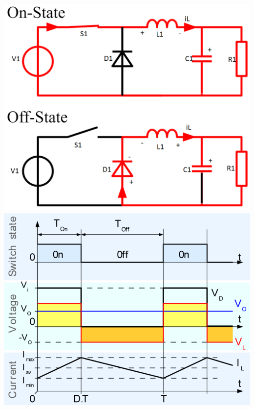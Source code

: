 \begin{minipage}{0.25\linewidth}
    \vspace{-3cm}
    \includegraphics[width=\linewidth]{images/BuckOnOff}
    \includegraphics[width=\linewidth]{images/BuckSwitch}
\end{minipage}
\vspace{-0.5cm}
